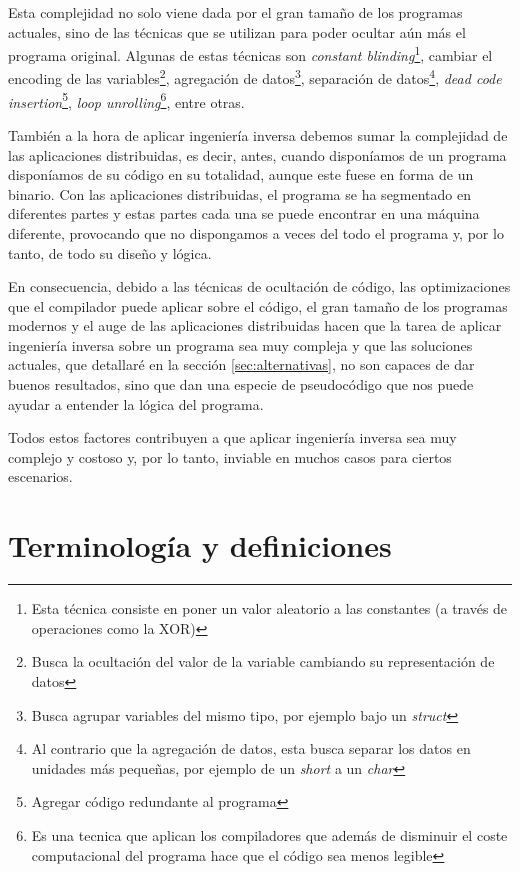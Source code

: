 Esta complejidad no solo viene dada por el gran tamaño de los programas actuales, sino de las técnicas que se utilizan para poder ocultar aún más el programa original. Algunas
de estas técnicas son \textit{constant blinding}\footnote{Esta técnica consiste en poner un valor aleatorio a las constantes (a través de operaciones como la XOR)}, cambiar el
encoding de las variables\footnote{Busca la ocultación del valor de la variable cambiando su representación de datos}, agregación de datos\footnote{Busca agrupar variables del mismo
tipo, por ejemplo bajo un \textit{struct}}, separación de datos\footnote{Al contrario que la agregación de datos, esta busca separar los datos en unidades más pequeñas, por ejemplo
de un \textit{short} a un \textit{char}}, \textit{dead code insertion}\footnote{Agregar código redundante al programa}, \textit{loop unrolling}\footnote{Es una tecnica que aplican
los compiladores que además de disminuir el coste computacional del programa hace que el código sea menos legible}, entre otras. \cite{TecnicasIlegibleBinario}

También a la hora de aplicar ingeniería inversa debemos sumar la complejidad de las aplicaciones distribuidas, es decir, antes, cuando disponíamos de un programa disponíamos de su
código en su totalidad, aunque este fuese en forma de un binario. Con las aplicaciones distribuidas, el programa se ha segmentado en diferentes partes y estas partes cada una se
puede encontrar en una máquina diferente, provocando que no dispongamos a veces del todo el programa y, por lo tanto, de todo su diseño y lógica.

En consecuencia, debido a las técnicas de ocultación de código, las optimizaciones que el compilador puede aplicar sobre el código, el gran tamaño de los programas modernos y el auge
de las aplicaciones distribuidas hacen que la tarea de aplicar ingeniería inversa sobre un programa sea muy compleja y que las soluciones actuales, que detallaré en la sección
\ref{sec:alternativas}, no son capaces de dar buenos resultados, sino que dan una especie de pseudocódigo que nos puede ayudar a entender la lógica del programa.

Todos estos factores contribuyen a que aplicar ingeniería inversa sea muy complejo y costoso y, por lo tanto, inviable en muchos casos para ciertos escenarios.

\section{Terminología y definiciones}
\label{sec:terminalogia}

